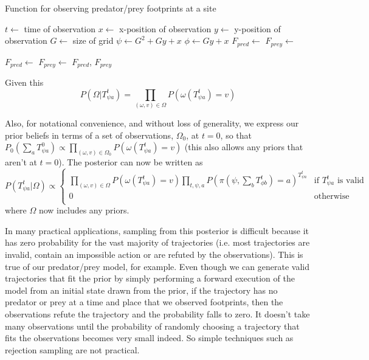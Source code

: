 \documentclass{article}
\begin{document}
\begin{algorithm}
\caption{Function for observing predator/prey footprints at a site}
\label{observationFunc}
\begin{algorithmic}
 
\State $t \leftarrow$ time of observation
\State $x \leftarrow$ x-position of observation
\State $y \leftarrow$ y-position of observation
\State $G \leftarrow$ size of grid
\State $\psi \leftarrow G^2 + Gy + x$     
\State $\phi \leftarrow Gy + x$     
\State $F_{pred} \leftarrow$   
\State $F_{prey} \leftarrow$   

\State $F_{pred} \leftarrow$ 
\EndIf
{}
\State $F_{prey} \leftarrow$ 
\EndIf
\State\Return $F_{pred}$, $F_{prey}$
\EndFunction
\end{algorithmic}
\end{algorithm}


Given this
\[
P(\Omega|T^t_{\psi a}) = \prod_{(\omega,v) \in \Omega} P(\omega(T^t_{\psi a})=v)
\]

Also, for notational convenience, and without loss of generality, we express our prior beliefs in terms of a set of observations, $\Omega_0$, at $t=0$, so that $P_0(\sum_a T^0_{\psi a}) \propto \prod_{(\omega,v) \in \Omega_0} P(\omega(T^t_{\psi a})=v)$ (this also allows any priors that aren't at $t=0$). The posterior can now be written as
\begin{equation}
P(T^t_{\psi a}|\Omega) \propto 
\begin{cases}
\prod_{(\omega,v) \in \Omega} P\left(\omega(T^{t}_{\psi a})=v\right) \prod_{t, \psi, a}P(\pi(\psi,\sum_bT^{t}_{\phi b})=a)^{T^{t}_{\psi a}} & \text{if } T^t_{\psi a} \text{ is valid} \\
0 & \text{otherwise}\\
\end{cases}
\label{posterior}
\end{equation}
where $\Omega$ now includes any priors.

In many practical applications, sampling from this posterior is difficult because it has zero probability for the vast majority of trajectories (i.e. most trajectories are invalid, contain an impossible action or are refuted by the observations). This is true of our predator/prey model, for example. Even though we can generate valid trajectories that fit the prior by simply performing a forward execution of the model from an initial state drawn from the prior, if the trajectory has no predator or prey at a time and place that we observed footprints, then the observations refute the trajectory and the probability falls to zero. It doesn't take many observations until the probability of randomly choosing a trajectory that fits the observations becomes very small indeed. So simple techniques such as rejection sampling are not practical.
\end{document}

